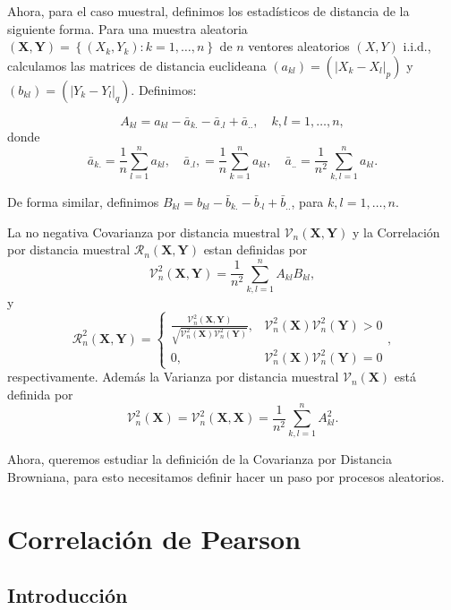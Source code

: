 	Ahora, para el caso muestral, definimos los estad\'isticos de distancia de la siguiente forma. Para una muestra aleatoria $(\mathbf{X}, \mathbf{Y})=\left\{\left(X_k, Y_k\right): k=1, \ldots, n\right\}$ de $n$ ventores aleatorios $(X, Y)$ i.i.d., calculamos las matrices de distancia euclideana  $\left(a_{k l}\right)=\left(\left|X_k-X_l\right|_p\right)$ y $\left(b_{k l}\right)=\left(\left|Y_k-Y_l\right|_q\right)$. Definimos:

	$$
	A_{k l}=a_{k l}-\bar{a}_{k .}-\bar{a}_{. l}+\bar{a}_{. .}, \quad k, l=1, \ldots, n,
	$$
	donde
	$$
	\bar{a}_{k .}=\frac{1}{n} \sum_{l=1}^n a_{k l}, \quad \bar{a}_{. l},=\frac{1}{n} \sum_{k=1}^n a_{k l}, \quad \bar{a}_{. .}=\frac{1}{n^2} \sum_{k, l=1}^n a_{k l} .
	$$
	
	De forma similar, definimos $B_{k l}=b_{k l}-\bar{b}_{k .}-\bar{b}_{\cdot l}+\bar{b}_{. .}$, para $k, l=1, \ldots, n$.

	\begin{defn}
		La no negativa Covarianza por distancia muestral $\mathcal{V}_n(\mathbf{X}, \mathbf{Y})$ y la Correlaci\'on por distancia muestral $\mathcal{R}_n(\mathbf{X}, \mathbf{Y})$ estan definidas por
		$$
		\mathcal{V}_n^2(\mathbf{X}, \mathbf{Y})=\frac{1}{n^2} \sum_{k, l=1}^n A_{k l} B_{k l},
		$$
		y
		$$
		\mathcal{R}_n^2(\mathbf{X}, \mathbf{Y})= \begin{cases}\frac{\mathcal{V}_n^2(\mathbf{X}, \mathbf{Y})}{\sqrt{\mathcal{V}_n^2(\mathbf{X}) \mathcal{V}_n^2(\mathbf{Y})}}, & \mathcal{V}_n^2(\mathbf{X}) \mathcal{V}_n^2(\mathbf{Y})>0 \\ 0, & \mathcal{V}_n^2(\mathbf{X}) \mathcal{V}_n^2(\mathbf{Y})=0\end{cases},
		$$
		respectivamente. Adem\'as la Varianza por distancia muestral $\mathcal{V}_n(\mathbf{X})$ est\'a definida por
		$$
		\mathcal{V}_n^2(\mathbf{X})=\mathcal{V}_n^2(\mathbf{X}, \mathbf{X})=\frac{1}{n^2} \sum_{k, l=1}^n A_{k l}^2 .
		$$
	\end{defn}

	Ahora, queremos estudiar la definici\'on de la Covarianza por Distancia Browniana, para esto necesitamos definir hacer un paso por procesos aleatorios. 

\section[]{Correlaci\'on de Pearson}

	\subsection{Introducci\'on}
	
